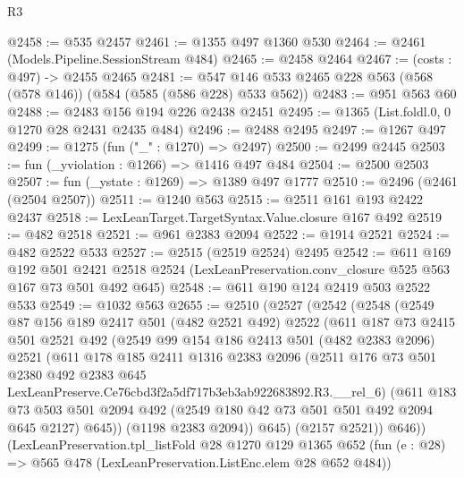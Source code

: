\begin{lexlean}{R3}
\begin{coremodule}
@2458 := @535 @2457
@2461 := @1355 @497 @1360 @530
@2464 := @2461 (Models.Pipeline.SessionStream @484)
@2465 := @2458 @2464
@2467 := (costs : @497) -> @2455 @2465
@2481 := @547 @146 @533 @2465 @228 @563 (@568 (@578 @146)) (@584 (@585 (@586 @228) @533 @562))
@2483 := @951 @563 @60
@2488 := @2483 @156 @194 @226 @2438 @2451
@2495 := @1365 (List.foldl.{0, 0} @1270 @28 @2431 @2435 @484)
@2496 := @2488 @2495
@2497 := @1267 @497
@2499 := @1275 (fun ("_" : @1270) => @2497)
@2500 := @2499 @2445
@2503 := fun (_yviolation : @1266) => @1416 @497 @484
@2504 := @2500 @2503
@2507 := fun (_ystate : @1269) => @1389 @497 @1777
@2510 := @2496 (@2461 (@2504 @2507))
@2511 := @1240 @563
@2515 := @2511 @161 @193 @2422 @2437
@2518 := LexLeanTarget.TargetSyntax.Value.closure @167 @492
@2519 := @482 @2518
@2521 := @961 @2383 @2094
@2522 := @1914 @2521
@2524 := @482 @2522 @533
@2527 := @2515 (@2519 @2524) @2495
@2542 := @611
    @169
    @192
    @501
    @2421
    @2518
    @2524
    (LexLeanPreservation.conv_closure @525 @563 @167 @73 @501 @492 @645)
@2548 := @611 @190 @124 @2419 @503 @2522 @533
@2549 := @1032 @563
@2655 := @2510
    (@2527
      (@2542
        (@2548
          (@2549
            @87
            @156
            @189
            @2417
            @501
            (@482 @2521 @492)
            @2522
            (@611
              @187
              @73
              @2415
              @501
              @2521
              @492
              (@2549
                @99
                @154
                @186
                @2413
                @501
                (@482 @2383 @2096)
                @2521
                (@611
                  @178
                  @185
                  @2411
                  @1316
                  @2383
                  @2096
                  (@2511
                    @176
                    @73
                    @501
                    @2380
                    @492
                    @2383
                    @645
                    LexLeanPreserve.Ce76cbd3f2a5df717b3eb3ab922683892.R3.__rel_6)
                  (@611
                    @183
                    @73
                    @503
                    @501
                    @2094
                    @492
                    (@2549 @180 @42 @73 @501 @501 @492 @2094 @645 @2127)
                    @645))
                (@1198 @2383 @2094))
              @645)
            (@2157 @2521))
          @646))
      (LexLeanPreservation.tpl_listFold
        @28
        @1270
        @129
        @1365
        @652
        (fun (e : @28) => @565 @478 (LexLeanPreservation.ListEnc.elem @28 @652 @484))

\end{coremodule}
\end{lexlean}
